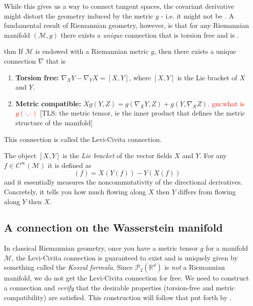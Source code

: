 \documentclass{article}
\newcommand{\man}{\mathcal{M}}
\newcommand{\tls}[1]{{\color{cyan}[TLS: #1]}}
\begin{document}
While this gives us a way to connect tangent spaces, the covariant derivative might distort the geometry induced by the metric $g$ - i.e. it might not be . A fundamental result of Riemannian geometry, however, is that for any Riemannian manifold $(\man, g)$ there exists a \textit{unique} connection that is torsion free and is . 

\begin{restatable}{thm}{}
    If $\man$ is endowed with a Riemannian metric $g$, then there exists a unique connection $\nabla$ that is
    \begin{enumerate}
        \item \textbf{Torsion free:} $\nabla_XY - \nabla_YX = [X,Y]$, where $[X,Y]$ is the Lie bracket of $X$ and $Y$. 
        \item \textbf{Metric compatible:} $Xg(Y, Z) = g(\nabla_XY, Z) + g(Y, \nabla_XZ).$ \textcolor{red}{gm:what is $g(\cdot,\cdot)$} \tls{the metric tensor, ie the inner product that defines the metric structure of the manifold}
    \end{enumerate}
    This connection is called the Levi-Civita connection.
\end{restatable}

The object $[X, Y]$ is the \textit{Lie bracket} of the vector fields $X$ and $Y$. For any $f \in C^{\infty}(\man)$ it is defined as
\begin{equation}
    [X, Y](f) = X(Y(f)) - Y(X(f))
\end{equation}
and it essentially measures the noncommutativity of the directional derivatives. Concretely, it tells you how much flowing along $X$ then $Y$ differs from flowing along $Y$ then $X$. 

\subsection{A connection on the Wasserstein manifold}


In classical Riemannian geometry, once you have a metric tensor $g$ for a manifold $\man$, the Levi-Civita connection is guaranteed to exist and is uniquely given by something called the \textit{Koszul formula}. Since $\mathcal{P}_2(\mathbb{R}^d)$ is \textit{not} a Riemannian manifold, we do not get the Levi-Civita connection for free. We need to construct a connection and \textit{verify} that the desirable properties (torsion-free and metric compatibility) are satisfied. This construction will follow that put forth by \citet{clancy2021interpolating}. 
\end{document}

